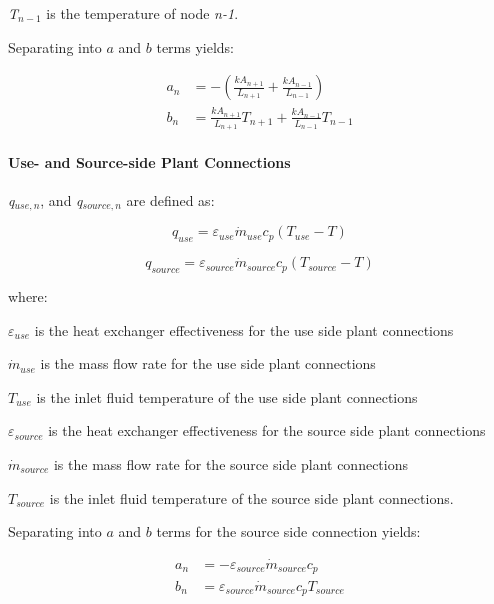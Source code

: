 \emph{T\(_{n-1}\)} is the temperature of node \emph{n-1}.

Separating into $a$ and $b$ terms yields:

\begin{equation}
  \begin{array}{rl}
    a_n &= - \left(\frac{kA_{n+1}}{L_{n+1}} + \frac{kA_{n-1}}{L_{n-1}}\right) \\
    b_n &= \frac{kA_{n+1}}{L_{n+1}} T_{n+1} + \frac{kA_{n-1}}{L_{n-1}} T_{n-1}
  \end{array}
\end{equation}

\paragraph{Use- and Source-side Plant Connections}

\emph{q\(_{use,n}\)}, and \emph{q\(_{source,n}\)} are defined as:

\begin{equation}
{q_{use}} = {\varepsilon_{use}}{\dot m_{use}}{c_p}\left( {{T_{use}} - T} \right)
\end{equation}

\begin{equation}
{q_{source}} = {\varepsilon_{source}}{\dot m_{source}}{c_p}\left( {{T_{source}} - T} \right)
\end{equation}

where:

\({\varepsilon_{use}}\) is the heat exchanger effectiveness for the use side plant connections

\({\dot m_{use}}\) is the mass flow rate for the use side plant connections

\(T_{use}\) is the inlet fluid temperature of the use side plant connections

\({\varepsilon_{source}}\) is the heat exchanger effectiveness for the source side plant connections

\({\dot m_{source}}\) is the mass flow rate for the source side plant connections

\(T_{source}\) is the inlet fluid temperature of the source side plant connections.

Separating into $a$ and $b$ terms for the source side connection yields:

\begin{equation}
  \begin{array}{rl}
    a_n &= - \varepsilon_{source} \dot{m}_{source} c_p \\
    b_n &= \varepsilon_{source} \dot{m}_{source} c_p T_{source}
  \end{array}
\end{equation}

